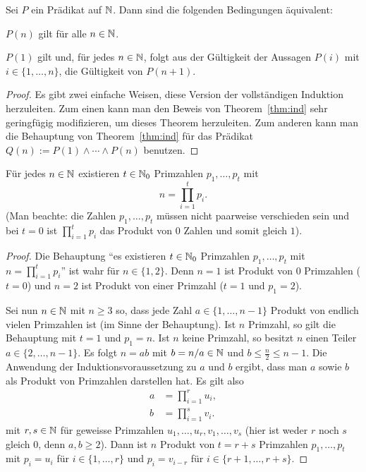 \begin{thm}
	\label{thm:ind:ver2}
	Sei $P$ ein Prädikat auf  $\mathbb{N}$. Dann sind die folgenden Bedingungen äquivalent: 
	\begin{enuma}
			\item $P(n)$ gilt für alle $n \in \mathbb{N}$. 
			\item $P(1)$ gilt und, für jedes $n \in \mathbb{N}$, folgt aus der Gültigkeit der Aussagen $P(i)$ mit $i \in \{1,\ldots,n\}$, die Gültigkeit von $P(n+1)$. 
	\end{enuma} 
\end{thm} 
\begin{proof} 
	Es gibt zwei einfache Weisen, diese Version der vollständigen Induktion herzuleiten. Zum einen kann man den Beweis von Theorem~\ref{thm:ind} sehr geringfügig modifizieren, um dieses Theorem herzuleiten. Zum anderen kann man die Behauptung von Theorem~\ref{thm:ind} für das Prädikat $Q(n) := P(1) \wedge \cdots \wedge P(n)$ benutzen. 
\end{proof} 

\begin{thm} 
	Für jedes $n \in \mathbb{N}$ existieren $t \in \mathbb{N}_0$ Primzahlen $p_1,\ldots,p_t$ mit 
	\[
		n = \prod_{i=1}^t p_i.
	\] (Man beachte: die Zahlen $p_1,\ldots,p_t$ müssen nicht paarweise verschieden sein und bei $t=0$ ist $\prod_{i=1}^t p_i$ das Produkt von $0$ Zahlen und somit gleich $1$). 
\end{thm} 
\begin{proof} 
	Die Behauptung ``es existieren $t \in \mathbb{N}_0$ Primzahlen $p_1,\ldots,p_t$ mit $n=\prod_{i=1}^t p_i$'' ist wahr für $n \in\{1,2\}$. Denn $n=1$ ist Produkt von $0$ Primzahlen ($t=0$) und $n=2$ ist Produkt von einer Primzahl ($t=1$ und $p_1 =2$). 
	
	Sei nun $n \in \mathbb{N}$ mit $n \ge 3$ so, dass jede Zahl $a \in \{1,\ldots,n-1\}$ Produkt von endlich vielen Primzahlen ist (im Sinne der Behauptung). Ist $n$ Primzahl, so gilt die Behauptung mit $t=1$ und $p_1 = n$. Ist $n$ keine Primzahl, so besitzt $n$ einen Teiler $a \in \{2,\ldots,n-1\}$. Es folgt $n = a b$ mit $b = n / a \in \mathbb{N}$ und $b \le \frac{n}{2} \le n-1$. Die Anwendung der Induktionsvoraussetzung zu $a$ und $b$ ergibt, dass man $a$ sowie $b$ als Produkt von Primzahlen darstellen hat. Es gilt also 
	\begin{align*}
			a & = \prod_{i=1}^{r} u_i, 
		\\	b & = \prod_{i=1}^s  v_i.
	\end{align*} 
	mit $r, s \in \mathbb{N}$ für geweisse Primzahlen $u_1,\ldots,u_r,v_1,\ldots,v_s$ (hier ist weder $r$ noch $s$ gleich $0$, denn $a,b \ge 2$). 
	Dann ist $n$ Produkt von $t = r+s$ Primzahlen $p_1,\ldots,p_t$ mit $p_i = u_i$ für $i \in \{1,\ldots,r\}$ und $p_i = v_{i-r}$ für $i \in \{r+1,\ldots,r+s\}$. 
\end{proof} 

